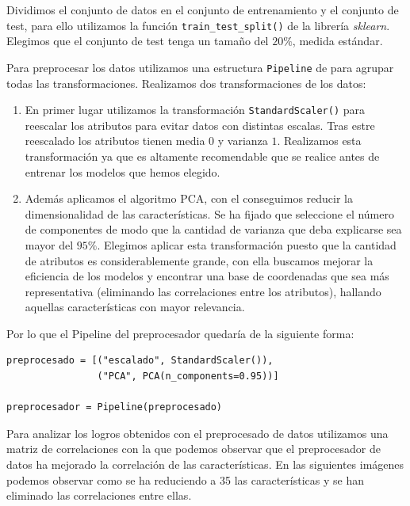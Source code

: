 \documentclass[size=a4, parskip=half, titlepage=false, toc=flat, toc=bib, 12pt]{scrartcl}
\begin{document}
Dividimos el conjunto de datos en el conjunto de entrenamiento y el conjunto de test, para ello utilizamos la función \verb|train_test_split()| de la librería \textit{sklearn}. Elegimos que el conjunto de test tenga un tamaño del $20\%$, medida estándar.

Para preprocesar los datos utilizamos una estructura \verb|Pipeline| de  para agrupar todas las transformaciones. Realizamos dos transformaciones de los datos:
\begin{enumerate}
\item En primer lugar utilizamos la transformación \verb|StandardScaler()| para reescalar los atributos para evitar datos con distintas escalas. Tras estre reescalado los atributos tienen media $0$ y varianza $1$. Realizamos esta transformación ya que es altamente recomendable que se realice antes de entrenar los modelos que hemos elegido.

\item Además aplicamos el algoritmo PCA, con el conseguimos reducir la dimensionalidad de las características. Se ha fijado que seleccione el número de componentes de modo que la cantidad de varianza que deba explicarse sea mayor del $95\%$. Elegimos aplicar esta transformación puesto que la cantidad de atributos es considerablemente grande, con ella buscamos mejorar la eficiencia de los modelos y encontrar una base de coordenadas que sea más representativa (eliminando las correlaciones entre los atributos), hallando aquellas características con mayor relevancia.

\end{enumerate}
Por lo que el Pipeline del preprocesador quedaría de la siguiente forma:
\begin{verbatim}
preprocesado = [("escalado", StandardScaler()),
                ("PCA", PCA(n_components=0.95))]

preprocesador = Pipeline(preprocesado)
\end{verbatim}
Para analizar los logros obtenidos con el preprocesado de datos utilizamos una matriz de correlaciones con la que podemos observar que el preprocesador de datos ha mejorado la correlación de las características. En las siguientes imágenes podemos observar como se ha reduciendo a 35 las características y se han eliminado las correlaciones entre ellas.
\end{document}
